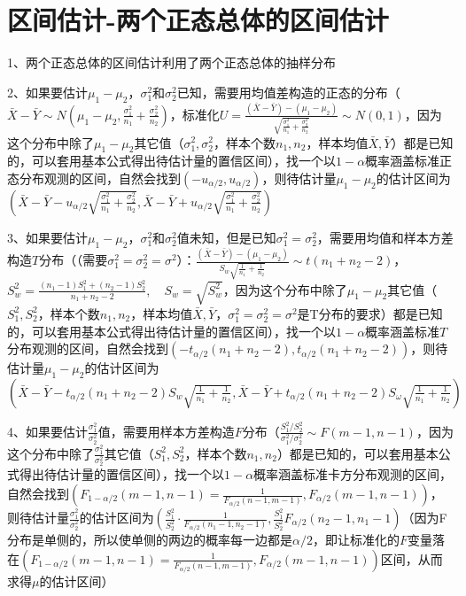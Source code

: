 \section{区间估计-两个正态总体的区间估计}

1、两个正态总体的区间估计利用了两个正态总体的抽样分布

2、如果要估计$\mu_1-\mu_2$，$\sigma_{1}^{2}$和$\sigma_{2}^{2}$已知，需要用均值差构造的正态的分布（$\bar{X}-\bar{Y} \sim N\left(\mu_{1}-\mu_{2}, \frac{\sigma_{1}^{2}}{n_{1}}+\frac{\sigma_{2}^{2}}{n_{2}}\right)$，标准化$ U=\frac{(\bar{X}-\bar{Y})-\left(\mu_{1}-\mu_{2}\right)}{\sqrt{\frac{\sigma_{1}^{2}}{n_{1}}+\frac{\sigma_{2}^{2}}{n_{2}}}} \sim N(0,1)$，因为这个分布中除了$\mu_{1}-\mu_{2}$其它值（$\sigma_{1}^{2},\sigma_{2}^{2}$，样本个数$n_1,n_2$，样本均值$\bar{X},\bar{Y}$）都是已知的，可以套用基本公式得出待估计量的置信区间），找一个以$1−α$概率涵盖标准正态分布观测的区间，自然会找到$(−u_{\alpha/2},u_{\alpha/2})$，则待估计量$\mu_1-\mu_2$的估计区间为$ \left(\bar{X}-\bar{Y}-u_{{\alpha}/{2}} \sqrt{\frac{\sigma_{1}^{2}}{n_{1}}+\frac{\sigma_{2}^{2}}{n_{2}}}, \bar{X}-\bar{Y}+u_{{\alpha}/{2}} \sqrt{\frac{\sigma_{1}^{2}}{n_{1}}+\frac{\sigma_{2}^{2}}{n_{2}}}\right)$

3、如果要估计$\mu_1-\mu_2$，$\sigma_{1}^{2}$和$\sigma_{2}^{2}$值未知，但是已知$\sigma_{1}^{2}=\sigma_{2}^{2}$，需要用均值和样本方差构造$T$分布（（需要$\sigma_{1}^{2}=\sigma_{2}^{2}=\sigma^{2}$）：$\frac{(\bar{X}-\bar{Y})-\left(\mu_{1}-\mu_{2}\right)}{S_{w} \sqrt{\frac{1}{n_{1}}+\frac{1}{n_{2}}}} \sim t\left(n_{1}+n_{2}-2\right)$，$S_{w}^{2}=\frac{\left(n_{1}-1\right) S_{1}^{2}+\left(n_{2}-1\right) S_{2}^{2}}{n_{1}+n_{2}-2}, \quad S_{w}=\sqrt{S_{w}^{2}}$，因为这个分布中除了$\mu_{1}-\mu_{2}$其它值（$S_{1}^{2},S_{2}^{2}$，样本个数$n_1,n_2$，样本均值$\bar{X},\bar{Y}$，$\sigma_{1}^{2}=\sigma_{2}^{2}=\sigma^{2}$是T分布的要求）都是已知的，可以套用基本公式得出待估计量的置信区间），找一个以$1−α$概率涵盖标准$T$分布观测的区间，自然会找到$(−t_{\alpha/2}(n_{1}+n_{2}-2),t_{\alpha/2}(n_{1}+n_{2}-2))$，则待估计量$\mu_1-\mu_2$的估计区间为$\left(\bar{X}-\bar{Y}-t_{{\alpha}/{2}}\left(n_{1}+n_{2}-2\right) S_{w} \sqrt{\frac{1}{n_{1}}+\frac{1}{n_{2}}}\right. ,\left.\bar{X}-\bar{Y}+t_{{\alpha}/{2}}\left(n_{1}+n_{2}-2\right) S_{\omega} \sqrt{\frac{1}{n_{1}}+\frac{1}{n_{2}}}\right)$

4、如果要估计$\frac{\sigma_{1}^{2}}{\sigma_{2}^{2}}$值，需要用样本方差构造$F$分布（$\frac{S_{1}^{2} / S_{2}^{2}}{\sigma_{1}^{2} / \sigma_{2}^{2}} \sim F\left(m-1, n-1\right)$，因为这个分布中除了$\frac{\sigma_{1}^{2}}{\sigma_{2}^{2}}$其它值（$S_{1}^{2},S_{2}^{2}$，样本个数$n_1,n_2$）都是已知的，可以套用基本公式得出待估计量的置信区间），找一个以$1−α$概率涵盖标准卡方分布观测的区间，自然会找到$(F_{1-\alpha/2}(m−1,n−1)=\frac{1}{F_{{\alpha}/{2}}\left(n−1, m−1\right)},F_{\alpha/2}(m−1,n−1))$，则待估计量$\frac{\sigma_{1}^{2}}{\sigma_{2}^{2}}$的估计区间为$\left(\frac{S_{1}^{2}}{S_{2}^{2}} \cdot \frac{1}{F_{{\alpha}/{2}}\left(n_{1}-1, n_{2}-1\right)}, \frac{S_{1}^{2}}{S_{2}^{2}} F_{{\alpha}/{2}}\left(n_{2}-1, n_{1}-1\right.\right)$（因为F分布是单侧的，所以使单侧的两边的概率每一边都是$\alpha/2$，即让标准化的$F$变量落在$(F_{1-\alpha/2}(m−1,n−1)=\frac{1}{F_{{\alpha}/{2}}\left(n−1, m−1\right)},F_{\alpha/2}(m−1,n−1))$区间，从而求得$\mu$的估计区间）

